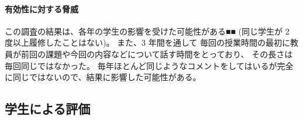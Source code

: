 \paragraph{有効性に対する脅威}
この調査の結果は、各年の学生の影響を受けた可能性がある■■ (同じ学生が 2 度以上履修したことはない)。
また、3 年間を通して
毎回の授業時間の最初に教員が前回の課題や今回の内容などについて話す時間をとっており、
その長さは毎回同じではなかった。
毎年ほとんど同じようなコメントをしてはいるが完全に同じではないので、結果に影響した可能性がある。

\subsection{学生による評価}
\label{subsection:result__students}

